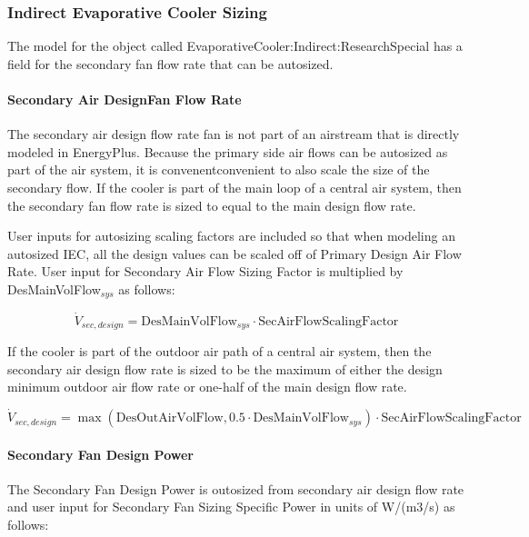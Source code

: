 \subsubsection{Indirect Evaporative Cooler Sizing}\label{indirect-evaporative-cooler-sizing-000}

The model for the object called EvaporativeCooler:Indirect:ResearchSpecial has a field for the secondary fan flow rate that can be autosized.

\paragraph{Secondary Air DesignFan Flow Rate}\label{secondary-air-designfan-flow-rate}

The secondary air design flow rate fan is not part of an airstream that is directly modeled in EnergyPlus. Because the primary side air flows can be autosized as part of the air system, it is convenentconvenient to also scale the size of the secondary flow. If the cooler is part of the main loop of a central air system, then the secondary fan flow rate is sized to equal to the main design flow rate.

User inputs for autosizing scaling factors are included so that when modeling an autosized IEC, all the design values can be scaled off of Primary Design Air Flow Rate. User input for Secondary Air Flow Sizing Factor is multiplied by DesMainVolFlow\(_{sys}\) as follows:

\begin{equation}
\dot{V}_{sec,design} = \text{DesMainVolFlow}_{sys}\cdot\text{SecAirFlowScalingFactor}
\end{equation}

If the cooler is part of the outdoor air path of a central air system, then the secondary air design flow rate is sized to be the maximum of either the design minimum outdoor air flow rate or one-half of the main design flow rate.

\begin{equation}
\dot{V}_{sec,design} = \max\left(\text{DesOutAirVolFlow},0.5\cdot\text{DesMainVolFlow}_{sys}\right)\cdot\text{SecAirFlowScalingFactor}
\end{equation}

\paragraph{Secondary Fan Design Power}\label{secondary-fan-design-power}

The Secondary Fan Design Power is outosized from secondary air design flow rate and user input for Secondary Fan Sizing Specific Power in units of W/(m3/s) as follows:


